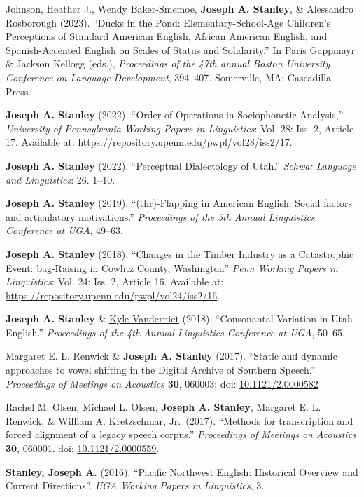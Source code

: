 \documentclass[
]{article}
\begin{document}
{Johnson, Heather J.}, Wendy Baker-Smemoe, \textbf{Joseph A. Stanley},
\& Alessandro Rosborough (2023). ``Ducks in the Pond:
Elementary-School-Age Children's Perceptions of Standard American
English, African American English, and Spanish-Accented English on
Scales of Status and Solidarity.'' In Paris Gappmayr \& Jackson Kellogg
(eds.), \emph{Proceedings of the 47th annual Boston University
Conference on Language Development}, 394--407. Somerville, MA:
Cascadilla Press.

\textbf{Joseph A. Stanley} (2022). ``Order of Operations in
Sociophonetic Analysis,'' \emph{University of Pennsylvania Working
Papers in Linguistics}: Vol. 28: Iss. 2, Article 17. Available at:
\href{https://repository.upenn.edu/pwpl/vol28/iss2/17/}{https://repository.upenn.edu/pwpl/vol28/iss2/17}.

\textbf{Joseph A. Stanley} (2022). ``Perceptual Dialectology of Utah.''
\emph{Schwa: Language and Linguistics}: 26. 1--10.

\textbf{Joseph A. Stanley} (2019). ``(thr)-Flapping in American English:
Social factors and articulatory motivations.'' \emph{Proceedings of the
5th Annual Linguistics Conference at UGA}, 49--63.

\textbf{Joseph A. Stanley} (2018). ``Changes in the Timber Industry as a
Catastrophic Event: bag-Raising in Cowlitz County, Washington''
\emph{Penn Working Papers in Linguistics}: Vol. 24: Iss. 2, Article 16.
Available at:
\href{https://repository.upenn.edu/pwpl/vol24/iss2/16/}{https://repository.upenn.edu/pwpl/vol24/iss2/16}.

\textbf{Joseph A. Stanley} \&
\href{https://clyguy.wixsite.com/profile}{Kyle Vanderniet} (2018).
``Consonantal Variation in Utah English.'' \emph{Proceedings of the 4th
Annual Linguistics Conference at UGA}, 50--65.

Margaret E. L. Renwick \& \textbf{Joseph A. Stanley} (2017). ``Static
and dynamic approaches to vowel shifting in the Digital Archive of
Southern Speech.'' \emph{Proceedings of Meetings on Acoustics}
\textbf{30}, 060003; doi:
\href{http://dx.doi.org/10.1121/2.0000582}{10.1121/2.0000582}

Rachel M. Olsen, Michael L. Olsen, \textbf{Joseph A. Stanley}, Margaret
E. L. Renwick, \& William A. Kretzschmar, Jr.~(2017). ``Methods for
transcription and forced alignment of a legacy speech corpus.''
\emph{Proceedings of Meetings on Acoustics} \textbf{30}, 060001. doi:
\href{http://dx.doi.org/10.1121/2.0000559}{10.1121/2.0000559}.

\textbf{Stanley, Joseph A.} (2016). ``Pacific Northwest English:
Historical Overview and Current Directions''. \emph{UGA Working Papers
in Linguistics}, 3.
\end{document}
